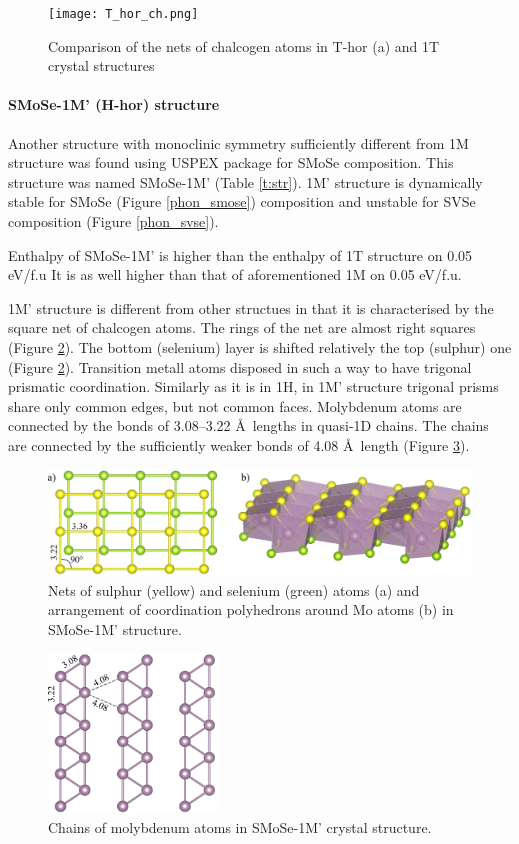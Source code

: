 \documentclass[a4paperm]{article}
\begin{document}
\begin{figure}[H]
	\texttt{[image: T\_hor\_ch.png]} \\
	\caption{Comparison of the nets of chalcogen atoms in T-hor (a) and 1T crystal structures }
	\label{T_hor_ch}
\end{figure}


\paragraph{SMoSe-1M' (H-hor) structure}
Another structure with monoclinic symmetry sufficiently different from 1M structure was found using USPEX package for SMoSe composition.
This structure was named SMoSe-1M' (Table \ref{t:str}).
1M' structure is dynamically stable for SMoSe (Figure \ref{phon_smose}) composition and unstable for SVSe composition (Figure \ref{phon_svse}).


Enthalpy of SMoSe-1M' is higher than the enthalpy of 1T structure on 0.05 eV/f.u
It is as well higher than that of aforementioned 1M on 0.05 eV/f.u.

1M' structure is different from other structues in that it is characterised by the square net of chalcogen atoms.
The rings of the net are almost right squares (Figure \ref{H-hor}).
The bottom (selenium) layer is shifted relatively the top (sulphur) one (Figure \ref{H-hor}).
Transition metall atoms disposed in such a way to have trigonal prismatic coordination.
Similarly as it is in 1H, in 1M' structure trigonal prisms share only common edges, but not common faces.
Molybdenum atoms are connected by the bonds of 3.08--3.22 \AA\ lengths in quasi-1D chains.
The chains are connected by the sufficiently weaker bonds of 4.08 \AA\ length (Figure \ref{H-hor_Mo}).


\begin{figure}[H]
	\includegraphics[width=\textwidth]{H-hor.png}
	\caption{Nets of sulphur (yellow) and selenium (green) atoms (a) and arrangement of coordination polyhedrons around Mo atoms (b) in SMoSe-1M' structure.}
	\label{H-hor}
\end{figure} 


\begin{figure}[H]
	\includegraphics[width=0.4\textwidth]{H-hor_Mo.png}
	\caption{Chains of molybdenum atoms in SMoSe-1M' crystal structure.}
	\label{H-hor_Mo}
\end{figure} 
\end{document}
